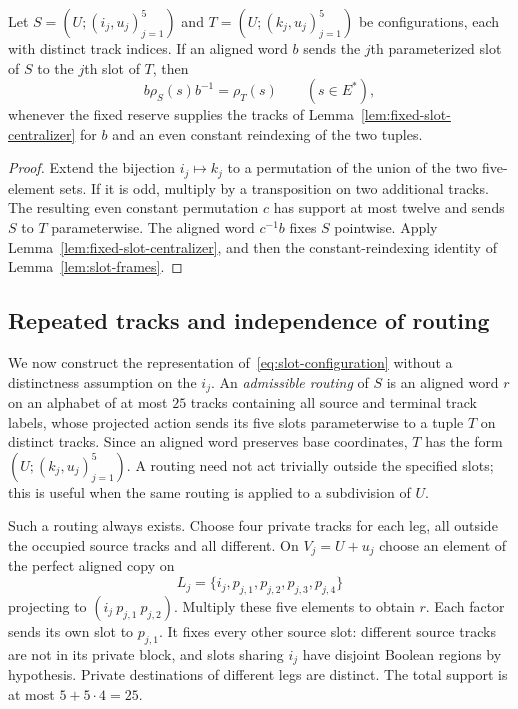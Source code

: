 \begin{lemma}
\label{lem:distinct-slot-transport}
Let $S=(U;(i_j,u_j)_{j=1}^5)$ and
$T=(U;(k_j,u_j)_{j=1}^5)$ be configurations, each with distinct track
indices.  If an aligned word $b$ sends the $j$th parameterized slot of
$S$ to the $j$th slot of $T$, then
\begin{equation}
 b\rho_S(s)b^{-1}=\rho_T(s)\qquad(s\in E^\ast),
 \label{eq:distinct-aligned-transport}
\end{equation}
whenever the fixed reserve supplies the tracks of
Lemma~\ref{lem:fixed-slot-centralizer} for $b$ and an even constant
reindexing of the two tuples.
\end{lemma}

\begin{proof}
Extend the bijection $i_j\mapsto k_j$ to a permutation of the union of
the two five-element sets.  If it is odd, multiply by a transposition on
two additional tracks.  The resulting even constant permutation $c$
has support at most twelve and sends $S$ to $T$ parameterwise.
The aligned word $c^{-1}b$ fixes $S$ pointwise.  Apply
Lemma~\ref{lem:fixed-slot-centralizer}, and then the constant-reindexing
identity of Lemma~\ref{lem:slot-frames}.
\end{proof}

\subsection{Repeated tracks and independence of routing}

We now construct the representation of~\eqref{eq:slot-configuration}
without a distinctness assumption on the $i_j$.  An \emph{admissible
routing} of $S$ is an aligned word $r$ on an alphabet of at most
$25$ tracks containing all source and terminal track labels, whose
projected action sends its five slots parameterwise to a tuple $T$ on
distinct tracks.  Since an aligned word preserves base
coordinates, $T$ has the form $(U;(k_j,u_j)_{j=1}^5)$.  A routing need not
act trivially outside the specified slots; this is useful when the same
routing is applied to a subdivision of $U$.

Such a routing always exists.  Choose four private tracks for each leg,
all outside the occupied source tracks and all different.  On
$V_j=U+u_j$ choose an element of the perfect aligned copy on
\[
 L_j=\{i_j,p_{j,1},p_{j,2},p_{j,3},p_{j,4}\}
\]
projecting to $(i_j\ p_{j,1}\ p_{j,2})$.  Multiply these five elements
to obtain $r$.  Each factor sends its own slot to $p_{j,1}$.  It fixes
every other source slot: different source tracks are not in its private
block, and slots sharing $i_j$ have disjoint Boolean regions by
hypothesis.  Private destinations of different legs are distinct.
The total support is at most $5+5\cdot4=25$.

